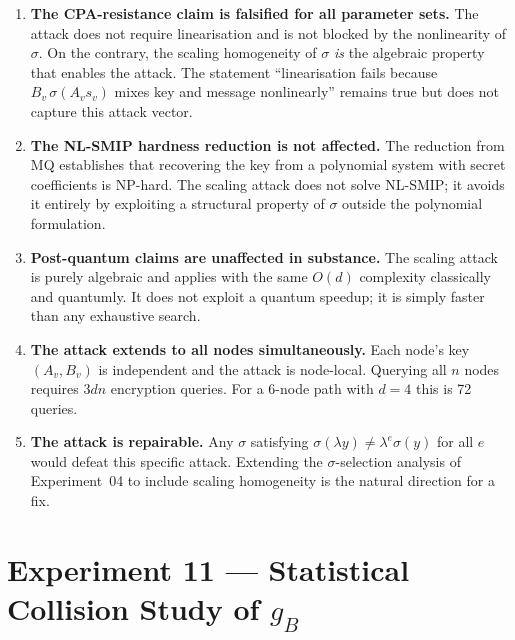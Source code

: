 \documentclass[12pt,a4paper]{article}
\theoremstyle{definition}
\begin{document}
\begin{enumerate}

  \item \textbf{The CPA-resistance claim is falsified for all
    parameter sets.} The attack does not require linearisation and
    is not blocked by the nonlinearity of $\sigma$. On the contrary,
    the scaling homogeneity of $\sigma$ \emph{is} the algebraic
    property that enables the attack. The statement ``linearisation
    fails because $B_v\,\sigma(A_v s_v)$ mixes key and message
    nonlinearly'' remains true but does not capture this attack
    vector.

  \item \textbf{The NL-SMIP hardness reduction is not affected.}
    The reduction from MQ establishes that recovering the key from a
    polynomial system with secret coefficients is NP-hard. The
    scaling attack does not solve NL-SMIP; it avoids it entirely by
    exploiting a structural property of $\sigma$ outside the
    polynomial formulation.

  \item \textbf{Post-quantum claims are unaffected in substance.}
    The scaling attack is purely algebraic and applies with the same
    $O(d)$ complexity classically and quantumly. It does not exploit
    a quantum speedup; it is simply faster than any exhaustive
    search.

  \item \textbf{The attack extends to all nodes simultaneously.}
    Each node's key $(A_v, B_v)$ is independent and the attack is
    node-local. Querying all $n$ nodes requires $3dn$ encryption
    queries. For a 6-node path with $d = 4$ this is 72 queries.

  \item \textbf{The attack is repairable.} Any $\sigma$ satisfying
    $\sigma(\lambda y) \neq \lambda^e \sigma(y)$ for all $e$ would
    defeat this specific attack. Extending the $\sigma$-selection
    analysis of Experiment~04 to include scaling homogeneity is the
    natural direction for a fix.

\end{enumerate}

\section{Experiment 11 --- Statistical Collision Study of $g_B$}
\end{document}
